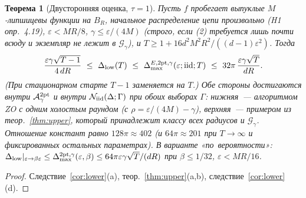 \documentclass[11pt,a4paper]{article}
\numberwithin{equation}{section}
\newtheorem{theorem}{Теорема}[section]
\theoremstyle{definition}
\theoremstyle{remark}
\newcommand{\Dmax}{\Delta_{\max}}\newcommand{\Dcp}{\Delta_{\rm cp}}\newcommand{\Dlow}{\Delta_{\rm low}}
\newcommand{\cN}{\mathcal N}\newcommand{\cA}{\mathcal A}\newcommand{\cG}{\mathcal G}\newcommand{\cF}{\mathcal F}
\begin{document}
\begin{theorem}[Двусторонняя оценка, $\tau=1$]\label{thm:main}
Пусть $f$ пробегает выпуклые $M$-липшицевы функции на $B_R$, начальное распределение цепи произвольно (H1 опр.~4.19), $\varepsilon<MR/8$, $\gamma\le\varepsilon/(4M)$ (строго, если (2) требуется лишь почти всюду и экземпляр не лежит в $\cG_\gamma$), и $T\ge1+16d^2M^2R^2/((d-1)\varepsilon^2)$. Тогда
\[
\frac{\varepsilon\gamma\sqrt{T-1}}{4\,dR}\ \le\ \Dlow(T)\ \le\ \Dmax^{E,\mathrm{2pt},\gamma}(\varepsilon;\iid;T)\ \le\ 32\pi\,\frac{\varepsilon\gamma\sqrt T}{dR}.
\]
(При стационарном старте $T-1$ заменяется на $T$.) Обе стороны достигаются внутри $\Atwo$ и внутри $\cN_\iid(\Delta;\Gamma)$ при обоих выборах $\Gamma$: нижняя~--- алгоритмом ZO с одним холостым раундом (с $\rho=\varepsilon/(4M)-\gamma$), верхняя~--- примером из теор.~\ref{thm:upper}, который принадлежит классу всех радиусов и $\cG_\gamma$. Отношение констант равно $128\pi\approx402$ (и $64\pi\approx201$ при $T\to\infty$ и фиксированных остальных параметрах). В варианте «по~вероятности»: $\Dlow|_{\varepsilon\to\beta\varepsilon}\le\Dmax^{\mathrm{2pt},\gamma}(\varepsilon,\beta)\le64\pi\varepsilon\gamma\sqrt T/(dR)$ при $\beta\le1/32$, $\varepsilon<MR/16$.
\end{theorem}
\begin{proof}
Следствие~\ref{cor:lower}(a), теор.~\ref{thm:upper}(a,b), следствие~\ref{cor:lower}(d).
\end{proof}
\end{document}
